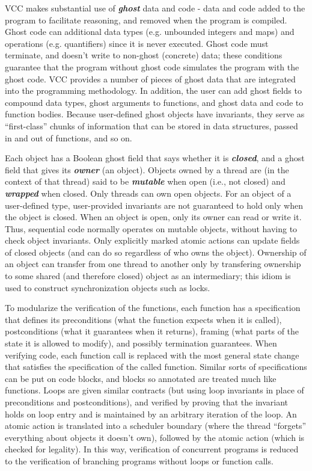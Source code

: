 \documentclass[preprint,nocopyrightspace]{sigplanconf}
\newcommand{\Def}[1]{\textit{\textbf{#1}}}
\begin{document}
VCC makes substantial use of \Def{ghost} data and code - data and code
added to the program to facilitate reasoning, and removed when the
program is compiled. Ghost code can additional data types (e.g.
unbounded integers and maps) and operations (e.g. quantifiers) since
it is never executed. Ghost code must terminate, and doesn't write to
non-ghost (concrete) data; these conditions guarantee that the program
without ghost code simulates the program with the ghost code. VCC
provides a number of pieces of ghost data that are integrated into the
programming methodology. In addition, the user can add ghost fields to
compound data types, ghost arguments to functions, and ghost data and
code to function bodies. Because user-defined ghost objects have
invariants, they serve as ``first-class'' chunks of information that
can be stored in data structures, passed in and out of functions, and
so on.

Each object has a Boolean ghost field that says whether it
is \Def{closed}, and a ghost field that gives its \Def{owner} (an
object). Objects owned by a thread are (in the context of that thread)
said to be \Def{mutable} when open (i.e., not closed)
and \Def{wrapped} when closed.  Only threads can own open objects. For
an object of a user-defined type, user-provided invariants are not
guaranteed to hold only when the object is closed.  When an object is
open, only its owner can read or write it. Thus, sequential code
normally operates on mutable objects, without having to check object
invariants. Only explicitly marked atomic actions can update fields of
closed objects (and can do so regardless of who owns the
object). Ownership of an object can transfer from one thread to
another only by transfering ownership to some shared (and therefore
closed) object as an intermediary; this idiom is used to construct
synchronization objects such as locks.

To modularize the verification of the functions, each function has a
specification that defines its preconditions (what the function
expects when it is called), postconditions (what it guarantees when it
returns), framing (what parts of the state it is allowed to modify),
and possibly termination guarantees. When verifying code, each
function call is replaced with the most general state change that
satisfies the specification of the called function.  Similar sorts of
specifications can be put on code blocks, and blocks so annotated are
treated much like functions.  Loops are given similar contracts (but
using loop invariants in place of preconditions and postconditions),
and verified by proving that the invariant holds on loop entry and is
maintained by an arbitrary iteration of the loop. An atomic action is
translated into a scheduler boundary (where the thread ``forgets''
everything about objects it doesn't own), followed by the atomic
action (which is checked for legality). In this way, verification of
concurrent programs is reduced to the verification of branching
programs without loops or function calls.
\end{document}
